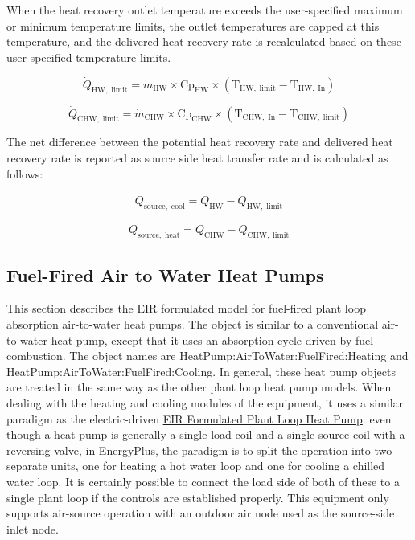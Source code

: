 When the heat recovery outlet temperature exceeds the user-specified maximum or minimum temperature limits, the outlet temperatures are capped at this temperature, and the delivered heat recovery rate is recalculated based on these user specified temperature limits.

\begin{equation}
\dot{Q}_\mathrm{HW,\; limit} = \dot{m}_\mathrm{HW} \times \mathrm{Cp}_\mathrm{HW} \times {(\mathrm{T}_\mathrm{HW,\; limit} - \mathrm{T}_\mathrm{HW,\; In})}
\end{equation}

\begin{equation}
\dot{Q}_\mathrm{CHW,\; limit} = \dot{m}_\mathrm{CHW} \times \mathrm{Cp}_\mathrm{CHW} \times {(\mathrm{T}_\mathrm{CHW,\; In} - \mathrm{T}_\mathrm{CHW,\; limit})}
\end{equation}

The net difference between the potential heat recovery rate and delivered heat recovery rate is reported as source side heat transfer rate and is calculated as follows:

\begin{equation}
\dot{Q}_\mathrm{source,\; cool} = \dot{Q}_\mathrm{HW} - \dot{Q}_\mathrm{HW,\; limit}
\end{equation}

\begin{equation}
\dot{Q}_\mathrm{source,\; heat} = \dot{Q}_\mathrm{CHW} - \dot{Q}_\mathrm{CHW,\; limit}
\end{equation}


\subsection{Fuel-Fired Air to Water Heat Pumps}\label{fuel-fired-air-to-water-heat-pumps}

This section describes the EIR formulated model for fuel-fired plant loop absorption air-to-water heat pumps. The object is similar to a conventional air-to-water heat pump, except that it uses an absorption cycle driven by fuel combustion. The object names are HeatPump:AirToWater:FuelFired:Heating and HeatPump:AirToWater:FuelFired:Cooling. In general, these heat pump objects are treated in the same way as the other plant loop heat pump models. When dealing with the heating and cooling modules of the equipment, it uses a similar paradigm as the electric-driven \hyperref[eir-plant-loop-heat-pump-model]{EIR Formulated Plant Loop Heat Pump}: even though a heat pump is generally a single load coil and a single source coil with a reversing valve, in EnergyPlus, the paradigm is to split the operation into two separate units, one for heating a hot water loop and one for cooling a chilled water loop. It is certainly possible to connect the load side of both of these to a single plant loop if the controls are established properly. This equipment only supports air-source operation with an outdoor air node used as the source-side inlet node.

